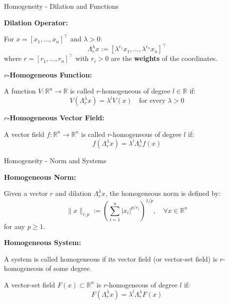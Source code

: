 \begin{frame}{Homogeneity - Dilation and Functions}

	\textbf{Dilation Operator:}

	For $x = [x_1, \ldots, x_n]^\top$ and $\lambda > 0$:
	$$\Lambda_r^\lambda x := [\lambda^{r_1} x_1, \ldots, \lambda^{r_n} x_n]^\top$$
	where $r = [r_1, \ldots, r_n]^\top$ with $r_i > 0$ are the \textbf{weights} of the coordinates.

	\vspace{0.5cm}
	\textbf{$r$-Homogeneous Function:}

	A function $V: \mathbb{R}^n \to \mathbb{R}$ is called \alert{$r$-homogeneous of degree $l \in \mathbb{R}$} if:
	$$V(\Lambda_r^\lambda x) = \lambda^l V(x) \quad \text{for every } \lambda > 0$$

	\textbf{$r$-Homogeneous Vector Field:}

	A vector field $f: \mathbb{R}^n \to \mathbb{R}^n$ is called \alert{$r$-homogeneous of degree $l$} if:
	$$f(\Lambda_r^\lambda x) = \lambda^l \Lambda_r^\lambda f(x)$$

\end{frame}

\begin{frame}{Homogeneity - Norm and Systems}

	\textbf{Homogeneous Norm:}

	Given a vector $r$ and dilation $\Lambda_r^\lambda x$, the homogeneous norm is defined by:
	$$\|x\|_{r,p} := \left(\sum_{i=1}^n |x_i|^{p/r_i}\right)^{1/p}, \quad \forall x \in \mathbb{R}^n$$
	for any $p \geq 1$.

	\vspace{0.5cm}
	\textbf{Homogeneous System:}

	A system is called \alert{homogeneous} if its vector field (or vector-set field) is $r$-homogeneous of some degree.

	\vspace{0.3cm}
	A vector-set field $F(x) \subset \mathbb{R}^n$ is \alert{$r$-homogeneous of degree $l$} if:
	$$F(\Lambda_r^\lambda x) = \lambda^l \Lambda_r^\lambda F(x)$$

\end{frame}

